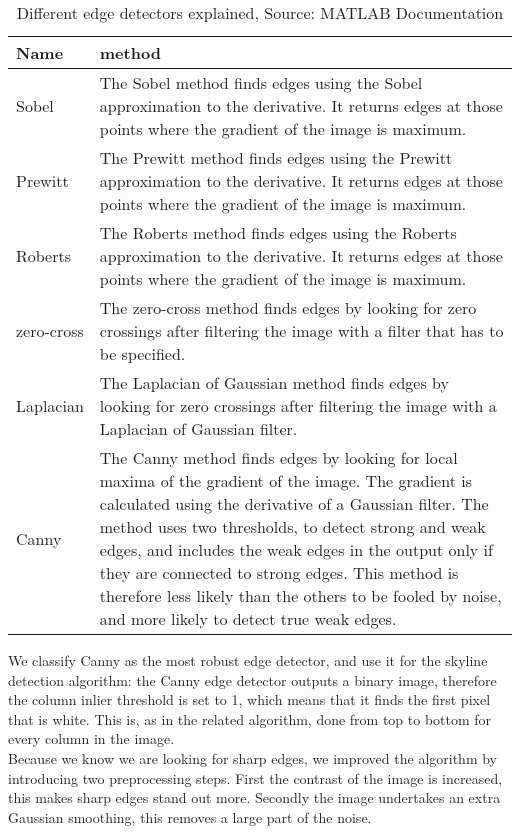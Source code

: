 \begin{table}[ht]
\caption{Different edge detectors explained, Source: MATLAB\cite{matlab} Documentation}
\label{tab:edge}
\begin{tabular}{|l|p{10cm}|}
	\hline
	Name & method\\
	\hline
	\hline
	Sobel					& The Sobel method finds edges using the Sobel
	approximation to the derivative. It returns edges at those points where the
	gradient of the image is maximum.\\
	\hline
	Prewitt					& The Prewitt method finds edges using the Prewitt
	approximation to the derivative. It returns edges at those points where the
	gradient of the image is maximum.\\
	\hline
	Roberts					& The Roberts method finds edges using the Roberts
	approximation to the derivative. It returns edges at those points where the
	gradient of the image is maximum.\\
	\hline
	zero-cross				& The zero-cross method finds edges by looking for zero
	crossings after filtering the image with a filter that has to be specified.\\
	\hline
	Laplacian				& The Laplacian of Gaussian method finds edges by
	looking for zero crossings after filtering the image with a Laplacian of Gaussian
	filter.\\
	\hline
	Canny					& The Canny method finds edges by looking for local
	maxima of the gradient of the image. The gradient is calculated using the derivative of
	a Gaussian filter. The method uses two thresholds, to detect strong and weak
	edges, and includes the weak edges in the output only if they are connected to
	strong edges. This method is therefore less likely than the others to be fooled
	by noise, and more likely to detect true weak edges.\\
	\hline
\end{tabular}
\end{table}
We classify Canny as the most robust edge detector, and use it for the skyline detection
algorithm: the Canny edge detector outputs a binary image, therefore the column inlier
threshold is set to 1, which means that it finds the first pixel that is white. 
This is, as in the related algorithm, done from top to bottom for every column in
the image.\\
Because we know we are looking for sharp edges, we improved the algorithm by
introducing two preprocessing steps. First the contrast of the image is
increased, this makes sharp edges stand out more. Secondly the image undertakes
an extra Gaussian smoothing, this removes a large part of the noise. 


